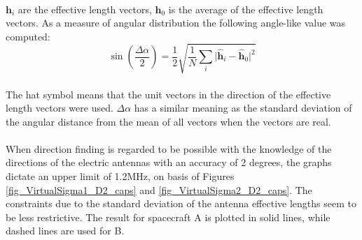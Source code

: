 \documentclass[a4paper,10pt]{thesis}
\begin{document}
\paragraph*{}
$\textbf{h}_i$ are the effective length vectors, $\textbf{h}_0$ is the average of the effective length vectors. As a measure of angular distribution the following angle-like value was computed:\\

\begin{equation}
\sin (\frac{ \Delta \alpha}{2}) = \frac{1}{2}\sqrt{\frac{1}{N}
\sum_i \vert \hat{\textbf{h}}_i - \hat{\textbf{h}}_0 \vert^2}
\end{equation}


\paragraph*{}
The hat symbol means that the unit vectors in the direction of the effective length vectors were used. $\Delta \alpha$ has a similar meaning as the standard deviation of the
angular distance from the mean of all vectors when the vectors are
real.


\paragraph*{}
When direction finding is regarded to be possible with the knowledge of the directions of the electric antennas with an accuracy of 2 degrees, the graphs dictate an upper limit of 1.2MHz, on basis of Figures \ref{fig_VirtualSigma1_D2_caps} and \ref{fig_VirtualSigma2_D2_caps}. The constraints due to the standard deviation of the antenna effective lengths seem to be less restrictive. The result for spacecraft A is plotted in solid lines, while dashed lines are used for B.
\end{document}
